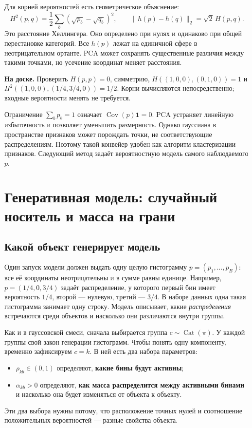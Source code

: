 \documentclass[11pt,a4paper]{article}
\newcommand{\board}[1]{\par\textbf{На доске.} #1\par}
\begin{document}
Для корней вероятностей есть геометрическое объяснение:
\[
 H^2(p,q)=\frac12\sum_b(\sqrt{p_b}-\sqrt{q_b})^2,
 \qquad \|h(p)-h(q)\|_2=\sqrt2\,H(p,q).
\]
Это расстояние Хеллингера. Оно определено при нулях и одинаково при
общей перестановке категорий. Все $h(p)$ лежат на единичной сфере в
неотрицательном ортанте. PCA может сохранять существенные различия
между такими точками, но усечение координат меняет расстояния.

\board{Проверить $H(p,p)=0$, симметрию,
$H((1,0,0),(0,1,0))=1$ и
$H^2((1,0,0),(1/4,3/4,0))=1/2$. Корни вычисляются непосредственно;
входные вероятности менять не требуется.}

Ограничение $\sum_bp_b=1$ означает
$\operatorname{Cov}(p)\mathbf1=0$. PCA устраняет линейную избыточность
и позволяет уменьшить размерность. Однако гауссиана в пространстве
признаков может порождать точки, не соответствующие распределениям.
Поэтому такой конвейер удобен как алгоритм кластеризации признаков.
Следующий метод задаёт вероятностную модель самого наблюдаемого $p$.

\section{Генеративная модель: случайный носитель и масса на грани}

\subsection{Какой объект генерирует модель}

Один запуск модели должен выдать одну целую гистограмму
$p=(p_1,\ldots,p_B)$: все её координаты неотрицательны и в сумме равны
единице. Например, $p=(1/4,0,3/4)$ задаёт распределение, у которого
первый бин имеет вероятность $1/4$, второй --- нулевую, третий --- $3/4$.
В наборе данных одна такая гистограмма занимает одну строку.
Модель описывает, какие \emph{распределения} встречаются среди объектов
и насколько они различаются внутри группы.

Как и в гауссовской смеси, сначала выбирается группа
$c\sim\operatorname{Cat}(\pi)$. У каждой группы свой закон генерации
гистограмм. Чтобы понять одну компоненту, временно зафиксируем $c=k$.
В ней есть два набора параметров:
\begin{itemize}
\item $\rho_{kb}\in(0,1)$ определяют, \textbf{какие бины будут активны};
\item $\alpha_{kb}>0$ определяют, \textbf{как масса распределится между
активными бинами} и насколько она будет изменяться от объекта к объекту.
\end{itemize}
Эти два выбора нужны потому, что расположение точных нулей и соотношение
положительных вероятностей --- разные свойства объекта.
\end{document}
